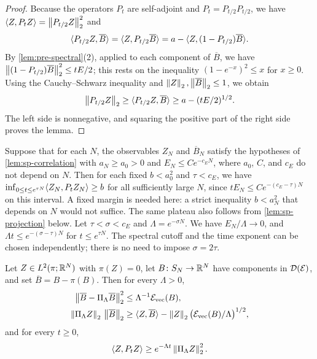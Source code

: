 \begin{proof}
Because the operators $P_t$ are self-adjoint and $P_t=P_{t/2}P_{t/2}$, we have $\langle Z,P_tZ\rangle=\left\lVert P_{t/2}Z\right\rVert_2^2$ and
\[
\langle P_{t/2}Z,\overline B\rangle=\langle Z,P_{t/2}\overline B\rangle=a-\langle Z,(1-P_{t/2})\overline B\rangle.
\]
By \cref{lem:pre-spectral}(2), applied to each component of $\overline B$, we have $\left\lVert(1-P_{t/2})\overline B\right\rVert_2^2\le tE/2$; this rests on the inequality $(1-e^{-x})^2\le x$ for $x\ge0$. Using the Cauchy--Schwarz inequality and $\left\lVert Z\right\rVert_2,\left\lVert\overline B\right\rVert_2\le1$, we obtain
\[
\left\lVert P_{t/2}Z\right\rVert_2\ge\langle P_{t/2}Z,\overline B\rangle\ge a-(tE/2)^{1/2}.
\]
The left side is nonnegative, and squaring the positive part of the right side proves the lemma.
\end{proof}

\begin{remark}\label{rem:sp-exponents}
Suppose that for each $N$, the observables $Z_N$ and $\overline B_N$ satisfy the hypotheses of \cref{lem:sp-correlation} with $a_N\ge a_0>0$ and $E_N\le Ce^{-c_EN}$, where $a_0$, $C$, and $c_E$ do not depend on $N$. Then for each fixed $b<a_0^2$ and $\tau<c_E$, we have $\inf_{0\le t\le e^{\tau N}}\langle Z_N,P_tZ_N\rangle\ge b$ for all sufficiently large $N$, since $tE_N\le Ce^{-(c_E-\tau)N}$ on this interval. A fixed margin is needed here: a strict inequality $b<a_N^2$ that depends on $N$ would not suffice. The same plateau also follows from \cref{lem:sp-projection} below. Let $\tau<\sigma<c_E$ and $\Lambda=e^{-\sigma N}$. We have $E_N/\Lambda\to0$, and $\Lambda t\le e^{-(\sigma-\tau)N}$ for $t\le e^{\tau N}$. The spectral cutoff and the time exponent can be chosen independently; there is no need to impose $\sigma=2\tau$.
\end{remark}

\begin{lemma}\label{lem:sp-projection}
Let $Z\in L^2(\pi;\mathbb R^N)$ with $\pi(Z)=0$, let $B\colon S_N\to\mathbb R^N$ have components in $\mathcal D(\mathcal E)$, and set $\overline B=B-\pi(B)$. Then for every $\Lambda>0$,
\begin{align}
\left\lVert\overline B-\Pi_\Lambda\overline B\right\rVert_2^2&\le\Lambda^{-1}\mathcal E_{\rm vec}(B),\label{eq:sp-proj-tail}\\
\left\lVert\Pi_\Lambda Z\right\rVert_2\,\left\lVert\overline B\right\rVert_2&\ge\langle Z,\overline B\rangle-\left\lVert Z\right\rVert_2\big(\mathcal E_{\rm vec}(B)/\Lambda\big)^{1/2},\label{eq:sp-proj}
\end{align}
and for every $t\ge0$,
\begin{equation}\label{eq:sp-proj-corr}
\langle Z,P_tZ\rangle\ge e^{-\Lambda t}\left\lVert\Pi_\Lambda Z\right\rVert_2^2.
\end{equation}
\end{lemma}


